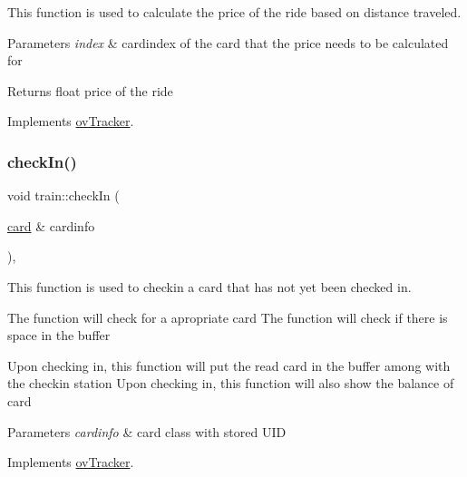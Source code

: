 This function is used to calculate the price of the ride based on distance traveled. 


\begin{DoxyParams}{Parameters}
{\em index} & cardindex of the card that the price needs to be calculated for \\
\hline
\end{DoxyParams}
\begin{DoxyReturn}{Returns}
float price of the ride 
\end{DoxyReturn}


Implements \hyperlink{classovTracker_ad50a46fc20404df988d477f5525ae9d9}{ov\+Tracker}.

\mbox{\label{classtrain_a1e0e594fdafed4ac60b5b6d81b91c2ca}} 
\subsubsection{\texorpdfstring{check\+In()}{checkIn()}}
{\footnotesize\ttfamily void train\+::check\+In (\begin{DoxyParamCaption}\item[{\hyperlink{classcard}{card} \&}]{cardinfo }\end{DoxyParamCaption})\hspace{0.3cm}{\ttfamily [override]}, {\ttfamily [virtual]}}



This function is used to checkin a card that has not yet been checked in. 

The function will check for a apropriate card The function will check if there is space in the buffer

Upon checking in, this function will put the read card in the buffer among with the checkin station Upon checking in, this function will also show the balance of card 
\begin{DoxyParams}{Parameters}
{\em cardinfo} & card class with stored U\+ID \\
\hline
\end{DoxyParams}


Implements \hyperlink{classovTracker_a1d5cd8f5a6bd02c91d6d010f1a3839ce}{ov\+Tracker}.

\mbox{\label{classtrain_ae631814ed393394a525646ada78e1994}} 
